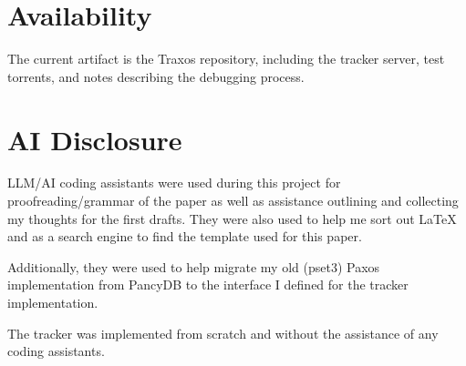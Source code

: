 \documentclass[letterpaper,twocolumn,10pt]{article}
\begin{document}
\section*{Availability}

The current artifact is the Traxos repository, including the tracker server,
test torrents, and notes describing the debugging process.

\section*{AI Disclosure}

LLM/AI coding assistants were used during this project for proofreading/grammar
of the paper as well as assistance outlining and collecting my thoughts for the
first drafts. They were also used to help me sort out LaTeX and as a search
engine to find the template used for this paper.

Additionally, they were used to help migrate my old (pset3) Paxos implementation
from PancyDB to the interface I defined for the tracker implementation.

The tracker was implemented from scratch and without the assistance of any
coding assistants.





\end{document}

